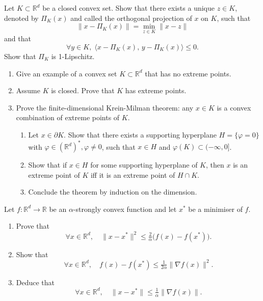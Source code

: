 \begin{exercise}
Let $K \subset \mathbb{R}^d$ be a closed convex set. Show that there exists a unique $z \in K$, denoted by $\Pi_K(x)$ and called the orthogonal projection of $x$ on $K$, such that
\[
\|x - \Pi_K(x)\| = \min_{z \in K} \|x-z\|
\]
and that
\[
\forall y \in K,\; \langle x - \Pi_K(x),\, y - \Pi_K(x)\rangle \leq 0.
\]
Show that $\Pi_K$ is 1-Lipschitz.
\end{exercise}

\begin{exercise}
\begin{enumerate}
  \item Give an example of a convex set $K \subset \mathbb{R}^d$ that has no extreme points.
  \item Assume $K$ is closed. Prove that $K$ has extreme points.
  \item Prove the finite-dimensional Krein-Milman theorem: any $x \in K$ is a convex combination of extreme points of $K$.
  \begin{enumerate}
    \item Let $x \in \partial K$. Show that there exists a supporting hyperplane $H = \{\varphi=0\}$ with $\varphi \in (\mathbb{R}^d)^*, \varphi \neq 0$, such that $x \in H$ and $\varphi(K) \subset (-\infty,0]$.
    \item Show that if $x \in H$ for some supporting hyperplane of $K$, then $x$ is an extreme point of $K$ iff it is an extreme point of $H \cap K$.
    \item Conclude the theorem by induction on the dimension.
  \end{enumerate}
\end{enumerate}
\end{exercise}

\begin{exercise}
Let $f : \mathbb{R}^d \to \mathbb{R}$ be an $\alpha$-strongly convex function and let $x^\ast$ be a minimiser of $f$.
\begin{enumerate}
  \item Prove that
  \[
    \forall x \in \mathbb{R}^d,\quad \|x-x^\ast\|^2 \leq \tfrac{2}{\alpha}\big(f(x)-f(x^\ast)\big).
  \]
  \item Show that
  \[
    \forall x \in \mathbb{R}^d,\quad f(x)-f(x^\ast) \leq \tfrac{1}{2\alpha}\|\nabla f(x)\|^2.
  \]
  \item Deduce that
  \[
    \forall x \in \mathbb{R}^d,\quad \|x-x^\ast\| \leq \tfrac{1}{\alpha}\|\nabla f(x)\|.
  \]
\end{enumerate}
\end{exercise}
